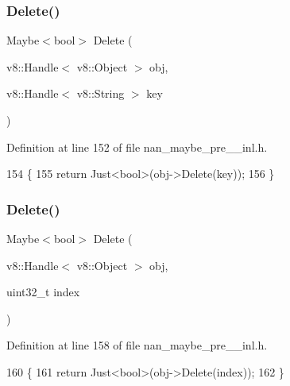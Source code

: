 \subsubsection{Delete()\hspace{0.1cm}{\footnotesize\ttfamily [1/2]}}
{\footnotesize\ttfamily Maybe$<$bool$>$ Delete (\begin{DoxyParamCaption}\item[{v8\+::\+Handle$<$ v8\+::\+Object $>$}]{obj,  }\item[{v8\+::\+Handle$<$ v8\+::\+String $>$}]{key }\end{DoxyParamCaption})}



Definition at line 152 of file nan\+\_\+maybe\+\_\+pre\+\_\+\_\+inl.\+h.


\begin{DoxyCode}
154                             \{
155   \textcolor{keywordflow}{return} Just<bool>(obj->Delete(key));
156 \}
\end{DoxyCode}
\mbox{\label{nan__maybe__pre__43__inl_8h_ad5a07b800846ecfe04efb0449e75e0b4}} 
\subsubsection{Delete()\hspace{0.1cm}{\footnotesize\ttfamily [2/2]}}
{\footnotesize\ttfamily Maybe$<$bool$>$ Delete (\begin{DoxyParamCaption}\item[{v8\+::\+Handle$<$ v8\+::\+Object $>$}]{obj,  }\item[{uint32\+\_\+t}]{index }\end{DoxyParamCaption})}



Definition at line 158 of file nan\+\_\+maybe\+\_\+pre\+\_\+\_\+inl.\+h.


\begin{DoxyCode}
160                     \{
161   \textcolor{keywordflow}{return} Just<bool>(obj->Delete(index));
162 \}
\end{DoxyCode}
\mbox{\label{nan__maybe__pre__43__inl_8h_a47ad902ee351507e3470becb343033ff}} 
